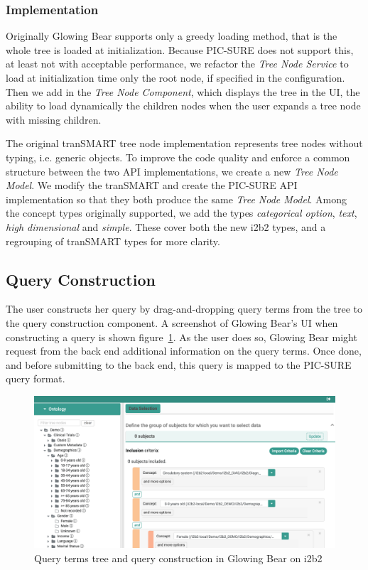 \subsubsection{Implementation}

Originally Glowing Bear supports only a greedy loading method, that is the whole tree is loaded at initialization.
Because PIC-SURE does not support this, at least not with acceptable performance, we refactor the \emph{Tree Node Service} to load at initialization time only the root node, if specified in the configuration.
Then we add in the \emph{Tree Node Component}, which displays the tree in the UI, the ability to load dynamically the children nodes when the user expands a tree node with missing children.

The original tranSMART tree node implementation represents tree nodes without typing, i.e. generic objects.
To improve the code quality and enforce a common structure between the two API implementations, we create a new \emph{Tree Node Model}.
We modify the tranSMART and create the PIC-SURE API implementation so that they both produce the same \emph{Tree Node Model}.
Among the concept types originally supported, we add the types \emph{categorical option}, \emph{text}, \emph{high dimensional} and \emph{simple}.
These cover both the new i2b2 types, and a regrouping of tranSMART types for more clarity.


\subsection{Query Construction}

The user constructs her query by drag-and-dropping query terms from the tree to the query construction component.
A screenshot of Glowing Bear's UI when constructing a query is shown figure~\ref{fig:gb-screenshot}.
As the user does so, Glowing Bear might request from the back end additional information on the query terms.
Once done, and before submitting to the back end, this query is mapped to the PIC-SURE query format.

\begin{figure}[ht]
    \centering
    \includegraphics[width=1\textwidth]{figures/gb_screenshot.png}
    \caption{Query terms tree and query construction in Glowing Bear on i2b2}
    \label{fig:gb-screenshot}
\end{figure}

